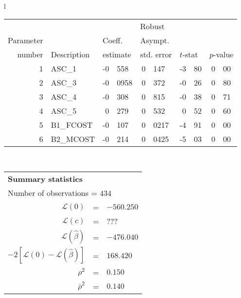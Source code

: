   \begin{tabular}{l}
\begin{tabular}{rlr@{.}lr@{.}lr@{.}lr@{.}l}
         &                       &   \multicolumn{2}{l}{}    & \multicolumn{2}{l}{Robust}  &     \multicolumn{4}{l}{}   \\
Parameter &                       &   \multicolumn{2}{l}{Coeff.}      & \multicolumn{2}{l}{Asympt.}  &     \multicolumn{4}{l}{}   \\
number &  Description                     &   \multicolumn{2}{l}{estimate}      & \multicolumn{2}{l}{std. error}  &   \multicolumn{2}{l}{$t$-stat}  &   \multicolumn{2}{l}{$p$-value}   \\

\hline

1 & ASC\_1 & -0&558 & 0&147 & -3&80 & 0&00 \\
2 & ASC\_3 & -0&0958 & 0&372 & -0&26 & 0&80 \\
3 & ASC\_4 & -0&308 & 0&815 & -0&38 & 0&71 \\
4 & ASC\_5 & 0&279 & 0&532 & 0&52 & 0&60 \\
5 & B1\_FCOST & -0&107 & 0&0217 & -4&91 & 0&00 \\
6 & B2\_MCOST & -0&214 & 0&0425 & -5&03 & 0&00 \\
\hline

\end{tabular}
\\
\begin{tabular}{rcl}
\multicolumn{3}{l}{\bf Summary statistics}\\
\multicolumn{3}{l}{ Number of observations = $434$} \\
 $\mathcal{L}(0)$ &=&  $-560.250$ \\
 $\mathcal{L}(c)$ &=& ???\\
 $\mathcal{L}(\hat{\beta})$ &=& $-476.040 $  \\
 $-2[\mathcal{L}(0) -\mathcal{L}(\hat{\beta})]$ &=& $168.420$ \\
    $\rho^2$ &=&   $0.150$ \\
    $\bar{\rho}^2$ &=&    $0.140$ \\
\end{tabular}
\end{tabular}

